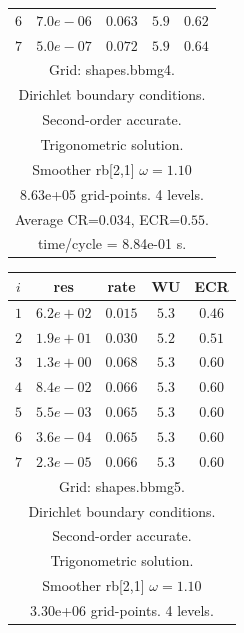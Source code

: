 \begin{table}[hbt]
\begin{center}
{\begin{tabular}{|c|c|c|c|c|}
 $ 6$  & $ 7.0e-06$ & $0.063$ & $ 5.9$ & $0.62$ \\ 
 $ 7$  & $ 5.0e-07$ & $0.072$ & $ 5.9$ & $0.64$ \\ 
\hline 
\multicolumn{5}{|c|}{Grid: shapes.bbmg4.}  \\
\multicolumn{5}{|c|}{Dirichlet boundary conditions.}  \\
\multicolumn{5}{|c|}{Second-order accurate.}  \\
\multicolumn{5}{|c|}{Trigonometric solution.}  \\
\multicolumn{5}{|c|}{Smoother rb[2,1] $\omega=1.10$}  \\
\multicolumn{5}{|c|}{8.63e+05 grid-points. 4 levels.}  \\
\multicolumn{5}{|c|}{Average CR=$0.034$, ECR=$0.55$.}  \\
\multicolumn{5}{|c|}{time/cycle = 8.84e-01 s.}  \\
\hline 
\end{tabular}
\begin{tabular}{|c|c|c|c|c|} \hline 
 $i$   & res      & rate    &  WU    & ECR  \\   \hline 
 $ 1$  & $ 6.2e+02$ & $0.015$ & $ 5.3$ & $0.46$ \\ 
 $ 2$  & $ 1.9e+01$ & $0.030$ & $ 5.2$ & $0.51$ \\ 
 $ 3$  & $ 1.3e+00$ & $0.068$ & $ 5.3$ & $0.60$ \\ 
 $ 4$  & $ 8.4e-02$ & $0.066$ & $ 5.3$ & $0.60$ \\ 
 $ 5$  & $ 5.5e-03$ & $0.065$ & $ 5.3$ & $0.60$ \\ 
 $ 6$  & $ 3.6e-04$ & $0.065$ & $ 5.3$ & $0.60$ \\ 
 $ 7$  & $ 2.3e-05$ & $0.066$ & $ 5.3$ & $0.60$ \\ 
\hline 
\multicolumn{5}{|c|}{Grid: shapes.bbmg5.}  \\
\multicolumn{5}{|c|}{Dirichlet boundary conditions.}  \\
\multicolumn{5}{|c|}{Second-order accurate.}  \\
\multicolumn{5}{|c|}{Trigonometric solution.}  \\
\multicolumn{5}{|c|}{Smoother rb[2,1] $\omega=1.10$}  \\
\multicolumn{5}{|c|}{3.30e+06 grid-points. 4 levels.}  \\

\end{tabular}}
\end{center}
\end{table}
